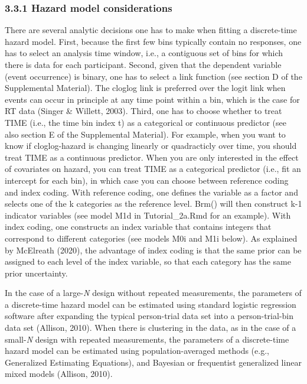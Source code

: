 \documentclass[
  man, donotrepeattitle,floatsintext]{apa6}
\begin{document}
\subsubsection{3.3.1 Hazard model considerations}\label{hazard-model-considerations}

There are several analytic decisions one has to make when fitting a discrete-time hazard model. First, because the first few bins typically contain no responses, one has to select an analysis time window, i.e., a contiguous set of bins for which there is data for each participant. Second, given that the dependent variable (event occurrence) is binary, one has to select a link function (see section D of the Supplemental Material). The cloglog link is preferred over the logit link when events can occur in principle at any time point within a bin, which is the case for RT data (Singer \& Willett, 2003). Third, one has to choose whether to treat TIME (i.e., the time bin index t) as a categorical or continuous predictor (see also section E of the Supplemental Material). For example, when you want to know if cloglog-hazard is changing linearly or quadracticly over time, you should treat TIME as a continuous predictor.
When you are only interested in the effect of covariates on hazard, you can treat TIME as a categorical predictor (i.e., fit an intercept for each bin), in which case you can choose between reference coding and index coding. With reference coding, one defines the variable as a factor and selects one of the k categories as the reference level. Brm() will then construct k-1 indicator variables (see model M1d in Tutorial\_2a.Rmd for an example). With index coding, one constructs an index variable that contains integers that correspond to different categories (see models M0i and M1i below). As explained by McElreath (2020), the advantage of index coding is that the same prior can be assigned to each level of the index variable, so that each category has the same prior uncertainty.

In the case of a large-\emph{N} design without repeated measurements, the parameters of a discrete-time hazard model can be estimated using standard logistic regression software after expanding the typical person-trial data set into a person-trial-bin data set (Allison, 2010). When there is clustering in the data, as in the case of a small-\emph{N} design with repeated measurements, the parameters of a discrete-time hazard model can be estimated using population-averaged methods (e.g., Generalized Estimating Equations), and Bayesian or frequentist generalized linear mixed models (Allison, 2010).
\end{document}

